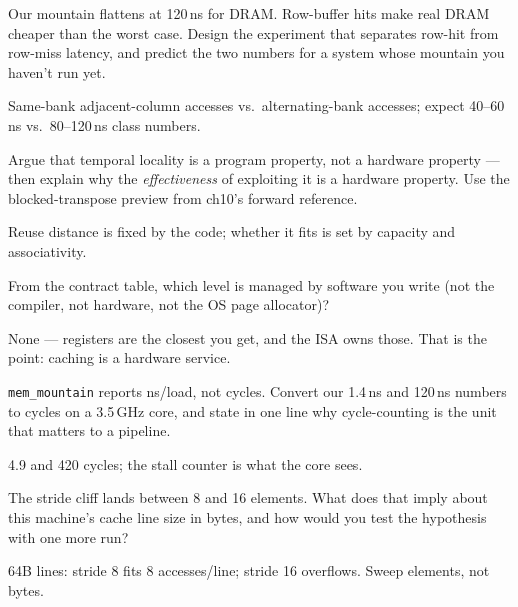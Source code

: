 \begin{exercise}[hard]

Our mountain flattens at 120\,ns for DRAM. Row-buffer hits make real
DRAM cheaper than the worst case. Design the experiment that
separates row-hit from row-miss latency, and predict the two numbers
for a system whose mountain you haven't run yet.
\end{exercise}
\begin{solution}[hint]
Same-bank adjacent-column accesses vs.\ alternating-bank
accesses; expect 40--60\,ns vs.\ 80--120\,ns class numbers.
\end{solution}

\begin{exercise}[hard]

Argue that temporal locality is a program property, not a hardware
property --- then explain why the \emph{effectiveness} of exploiting
it is a hardware property. Use the blocked-transpose preview from
ch10's forward reference.
\end{exercise}
\begin{solution}[hint]
Reuse distance is fixed by the code; whether it fits is set by
capacity and associativity.
\end{solution}

\begin{exercise}[easy]
From the contract table, which level is managed by software you
write (not the compiler, not hardware, not the OS page allocator)?
\end{exercise}
\begin{solution}[hint]
None --- registers are the closest you get, and the ISA owns
those. That is the point: caching is a hardware service.
\end{solution}

\begin{exercise}[medium]
\texttt{mem\_mountain} reports ns/load, not cycles. Convert our
1.4\,ns and 120\,ns numbers to cycles on a 3.5\,GHz core, and
state in one line why cycle-counting is the unit that matters to a
pipeline.
\end{exercise}
\begin{solution}[hint]
4.9 and 420 cycles; the stall counter is what the core sees.
\end{solution}

\begin{exercise}[medium]
The stride cliff lands between 8 and 16 elements. What does that
imply about this machine's cache line size in bytes, and how would
you test the hypothesis with one more run?
\end{exercise}
\begin{solution}[hint]
64B lines: stride 8 fits 8 accesses/line; stride 16 overflows.
Sweep elements, not bytes.
\end{solution}

